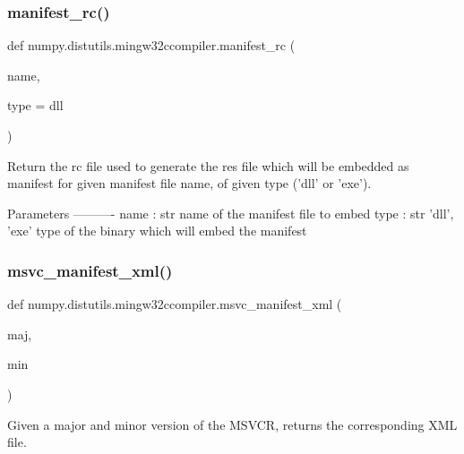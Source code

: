 \subsubsection{\texorpdfstring{manifest\+\_\+rc()}{manifest\_rc()}}
{\footnotesize\ttfamily def numpy.\+distutils.\+mingw32ccompiler.\+manifest\+\_\+rc (\begin{DoxyParamCaption}\item[{}]{name,  }\item[{}]{type = {\ttfamily \textquotesingle{}dll\textquotesingle{}} }\end{DoxyParamCaption})}

\begin{DoxyVerb}Return the rc file used to generate the res file which will be embedded
as manifest for given manifest file name, of given type ('dll' or
'exe').

Parameters
----------
name : str
        name of the manifest file to embed
type : str {'dll', 'exe'}
        type of the binary which will embed the manifest\end{DoxyVerb}
 \mbox{\label{namespacenumpy_1_1distutils_1_1mingw32ccompiler_a9ef6602a55c37af69cb12ada38d7ea4d}} 
\subsubsection{\texorpdfstring{msvc\+\_\+manifest\+\_\+xml()}{msvc\_manifest\_xml()}}
{\footnotesize\ttfamily def numpy.\+distutils.\+mingw32ccompiler.\+msvc\+\_\+manifest\+\_\+xml (\begin{DoxyParamCaption}\item[{}]{maj,  }\item[{}]{min }\end{DoxyParamCaption})}

\begin{DoxyVerb}Given a major and minor version of the MSVCR, returns the
corresponding XML file.\end{DoxyVerb}
 \mbox{\label{namespacenumpy_1_1distutils_1_1mingw32ccompiler_a326f0cfaa76bbbe6f161606aba7a435b}} 
